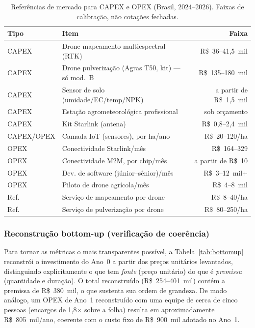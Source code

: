 \documentclass[conference]{IEEEtran}
\newcommand{\rs}{R\$}
\begin{document}
\begin{table}[!t]
\caption{Referências de mercado para CAPEX e OPEX (Brasil, 2024--2026). Faixas de calibração, não cotações fechadas.}
\label{tab:capexopex}
\centering
\footnotesize
\begin{tabular}{@{}llr@{}}
\toprule
\textbf{Tipo} & \textbf{Item} & \textbf{Faixa} \\
\midrule
CAPEX & Drone mapeamento multiespectral (RTK) & \rs~36--41,5~mil \\
CAPEX & Drone pulverização (Agras T50, kit) --- só mod.~B & \rs~135--180~mil \\
CAPEX & Sensor de solo (umidade/EC/temp/NPK) & a partir de \rs~1,5~mil \\
CAPEX & Estação agrometeorológica profissional & sob orçamento \\
CAPEX & Kit Starlink (antena) & \rs~0,8--2,4~mil \\
CAPEX/OPEX & Camada IoT (sensores), por ha/ano & \rs~20--120/ha \\
OPEX & Conectividade Starlink/mês & \rs~164--329 \\
OPEX & Conectividade M2M, por chip/mês & a partir de \rs~10 \\
OPEX & Dev. de software (júnior--sênior)/mês & \rs~3--12~mil$+$ \\
OPEX & Piloto de drone agrícola/mês & \rs~4--8~mil \\
Ref. & Serviço de mapeamento por drone & \rs~8--40/ha \\
Ref. & Serviço de pulverização por drone & \rs~80--250/ha \\
\bottomrule
\end{tabular}
\end{table}

\subsubsection{Reconstrução bottom-up (verificação de coerência)}
Para tornar as métricas o mais transparentes possível, a Tabela~\ref{tab:bottomup} reconstrói o investimento do Ano~0 a partir dos preços unitários levantados, distinguindo explicitamente o que tem \emph{fonte} (preço unitário) do que é \emph{premissa} (quantidade e duração). O total reconstruído (\rs~254--401~mil) contém a premissa de \rs~380~mil, o que sustenta sua ordem de grandeza. De modo análogo, um OPEX de Ano~1 reconstruído com uma equipe de cerca de cinco pessoas (encargos de 1,8$\times$ sobre a folha) resulta em aproximadamente \rs~805~mil/ano, coerente com o custo fixo de \rs~900~mil adotado no Ano~1.
\end{document}
